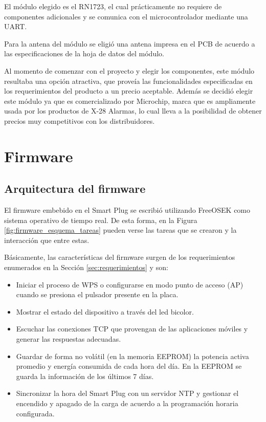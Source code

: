 El módulo elegido es el RN1723, el cual prácticamente no requiere de componentes adicionales y se comunica con el microcontrolador mediante una UART.

Para la antena del módulo se eligió una antena impresa en el PCB de acuerdo a las especificaciones de la hoja de datos del módulo.

Al momento de comenzar con el proyecto y elegir los componentes, este módulo resultaba una opción atractiva, que proveía las funcionalidades especificadas en los requerimientos del producto a un precio aceptable. Además se decidió elegir este módulo ya que es comercializado por Microchip, marca que es ampliamente usada por los productos de X-28 Alarmas, lo cual lleva a la posibilidad de obtener precios muy competitivos con los distribuidores.

\section{Firmware}

\subsection{Arquitectura del firmware}

El firmware embebido en el Smart Plug se escribió utilizando FreeOSEK como sistema operativo de tiempo real. De esta forma, en la Figura \ref{fig:firmware_esquema_tareas} pueden verse las tareas que se crearon y la interacción que entre estas.

Básicamente, las características del firmware surgen de los requerimientos enumerados en la Sección \ref{sec:requerimientos} y son:

\begin{itemize}
\item Iniciar el proceso de WPS o configurarse en modo punto de acceso (AP) cuando se presiona el pulsador presente en la placa.
\item Mostrar el estado del dispositivo a través del led bicolor.
\item Escuchar las conexiones TCP que provengan de las aplicaciones móviles y generar las respuestas adecuadas.
\item Guardar de forma no volátil (en la memoria EEPROM) la potencia activa promedio y energía consumida de cada hora del día. En la EEPROM se guarda la información de los últimos 7 días.
\item  Sincronizar la hora del Smart Plug con un servidor NTP y gestionar el encendido y apagado de la carga de acuerdo a la programación horaria configurada.
\end{itemize}

